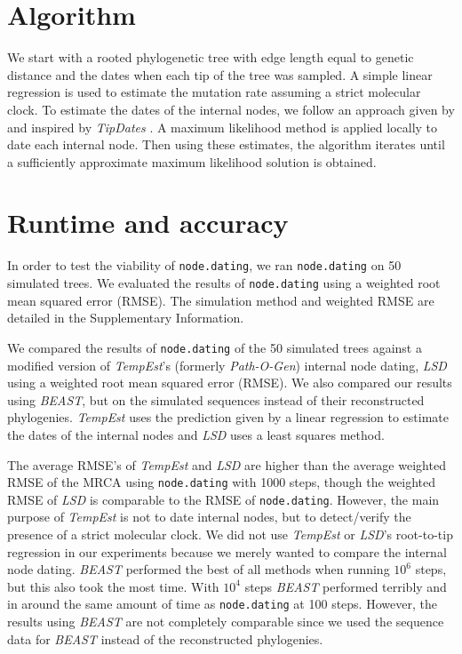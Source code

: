 \documentclass{bioinfo}
\newcommand{\code}[1]{{\tt #1}}
\begin{document}
\section{Algorithm} \label{sec:alg}
We start with a rooted phylogenetic tree with edge length equal to genetic distance and the dates when each tip of the tree was sampled.
A simple linear regression is used to estimate the mutation rate assuming a strict molecular clock.
To estimate the dates of the internal nodes, we follow an approach given by \cite{Felsenstein81} and inspired by \emph{TipDates} \citep{TipDates}.
A maximum likelihood method is applied locally to date each internal node.
Then using these estimates, the algorithm iterates until a sufficiently approximate maximum likelihood solution is obtained.

\section{Runtime and accuracy} \label{sec:tests}
In order to test the viability of \code{node.dating}, we ran \code{node.dating} on 50 simulated trees.
We evaluated the results of \code{node.dating} using a weighted root mean squared error (RMSE).
The simulation method and weighted RMSE are detailed in the Supplementary Information.

We compared the results of \code{node.dating} of the 50 simulated trees against a modified version of \emph{TempEst}'s (formerly \emph{Path-O-Gen}) internal node dating, \emph{LSD} using a weighted root mean squared error (RMSE).
We also compared our results using \emph{BEAST}, but on the simulated sequences instead of their reconstructed phylogenies.
\emph{TempEst} uses the prediction given by a linear regression to estimate the dates of the internal nodes and \emph{LSD} uses a least squares method.

The average RMSE's of \emph{TempEst} and \emph{LSD} are higher than the average weighted RMSE of the MRCA using \code{node.dating} with 1000 steps, though the weighted RMSE of \emph{LSD} is comparable to the RMSE of \code{node.dating}.
However, the main purpose of \emph{TempEst} is not to date internal nodes, but to detect/verify the presence of a strict molecular clock.
We did not use \emph{TempEst} or \emph{LSD}'s root-to-tip regression in our experiments because we merely wanted to compare the internal node dating. \emph{BEAST} performed the best of all methods when running $10^6$ steps, but this also took the most time.
With $10^4$ steps \emph{BEAST} performed terribly and in around the same amount of time as \code{node.dating} at 100 steps.
However, the results using \emph{BEAST} are not completely comparable since we used the sequence data for \emph{BEAST} instead of the reconstructed phylogenies.
\end{document}
